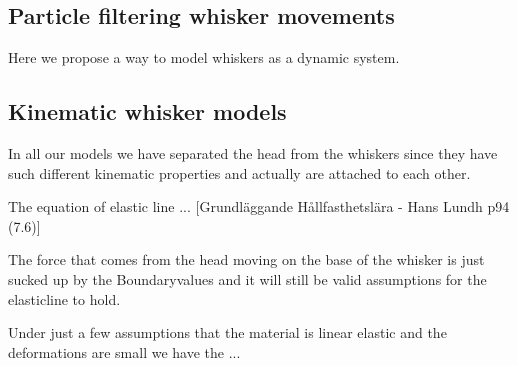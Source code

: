 \subsection{Particle filtering whisker movements}
Here we propose a way to model whiskers as a dynamic system.

\subsection{Kinematic whisker models}

In all our models we have separated the head from the whiskers since they have
such different kinematic properties and actually are attached to each other.




The equation of elastic line ... [Grundläggande Hållfasthetslära - Hans Lundh
p94 (7.6)]

The force that comes from the head moving on the base of the whisker is just 
sucked up by the Boundaryvalues and it will still be valid assumptions for the
elasticline to hold.

Under just a few assumptions that the material is linear elastic and the
deformations are small we have the ...



